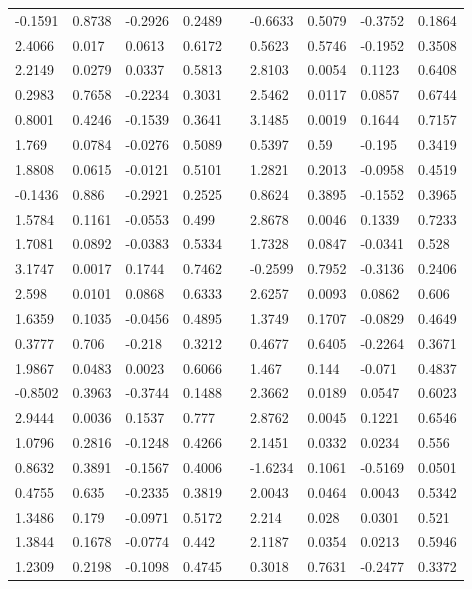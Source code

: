 \begin{table}[h!]
\begin{tabular}{lllllllll}
-0.1591 & 0.8738 & -0.2926 & 0.2489 &  & -0.6633 & 0.5079 & -0.3752 & 0.1864 \\
2.4066 & 0.017 & 0.0613 & 0.6172 &  & 0.5623 & 0.5746 & -0.1952 & 0.3508 \\
2.2149 & 0.0279 & 0.0337 & 0.5813 &  & 2.8103 & 0.0054 & 0.1123 & 0.6408 \\
0.2983 & 0.7658 & -0.2234 & 0.3031 &  & 2.5462 & 0.0117 & 0.0857 & 0.6744 \\
0.8001 & 0.4246 & -0.1539 & 0.3641 &  & 3.1485 & 0.0019 & 0.1644 & 0.7157 \\
1.769 & 0.0784 & -0.0276 & 0.5089 &  & 0.5397 & 0.59 & -0.195 & 0.3419 \\
1.8808 & 0.0615 & -0.0121 & 0.5101 &  & 1.2821 & 0.2013 & -0.0958 & 0.4519 \\
-0.1436 & 0.886 & -0.2921 & 0.2525 &  & 0.8624 & 0.3895 & -0.1552 & 0.3965 \\
1.5784 & 0.1161 & -0.0553 & 0.499 &  & 2.8678 & 0.0046 & 0.1339 & 0.7233 \\
1.7081 & 0.0892 & -0.0383 & 0.5334 &  & 1.7328 & 0.0847 & -0.0341 & 0.528 \\
3.1747 & 0.0017 & 0.1744 & 0.7462 &  & -0.2599 & 0.7952 & -0.3136 & 0.2406 \\
2.598 & 0.0101 & 0.0868 & 0.6333 &  & 2.6257 & 0.0093 & 0.0862 & 0.606 \\
1.6359 & 0.1035 & -0.0456 & 0.4895 &  & 1.3749 & 0.1707 & -0.0829 & 0.4649 \\
0.3777 & 0.706 & -0.218 & 0.3212 &  & 0.4677 & 0.6405 & -0.2264 & 0.3671 \\
1.9867 & 0.0483 & 0.0023 & 0.6066 &  & 1.467 & 0.144 & -0.071 & 0.4837 \\
-0.8502 & 0.3963 & -0.3744 & 0.1488 &  & 2.3662 & 0.0189 & 0.0547 & 0.6023 \\
2.9444 & 0.0036 & 0.1537 & 0.777 &  & 2.8762 & 0.0045 & 0.1221 & 0.6546 \\
1.0796 & 0.2816 & -0.1248 & 0.4266 &  & 2.1451 & 0.0332 & 0.0234 & 0.556 \\
0.8632 & 0.3891 & -0.1567 & 0.4006 &  & -1.6234 & 0.1061 & -0.5169 & 0.0501 \\
0.4755 & 0.635 & -0.2335 & 0.3819 &  & 2.0043 & 0.0464 & 0.0043 & 0.5342 \\
1.3486 & 0.179 & -0.0971 & 0.5172 &  & 2.214 & 0.028 & 0.0301 & 0.521 \\
1.3844 & 0.1678 & -0.0774 & 0.442 &  & 2.1187 & 0.0354 & 0.0213 & 0.5946 \\
1.2309 & 0.2198 & -0.1098 & 0.4745 &  & 0.3018 & 0.7631 & -0.2477 & 0.3372 \\

\end{tabular}
\end{table}
